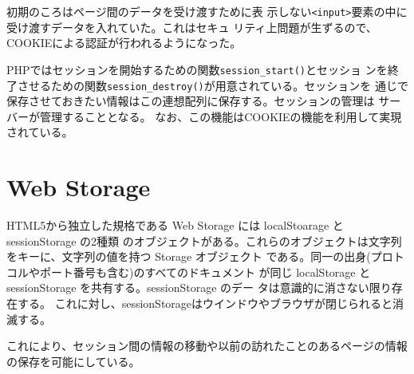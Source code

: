 初期のころはページ間のデータを受け渡すために表
示しない\texttt{<input>}要素の中に受け渡すデータを入れていた。これはセキュ
リティ上問題が生ずるので、COOKIEによる認証が行われるようになった。

PHPではセッションを開始するための関数\texttt{session\_start()}とセッショ
ンを終了させるための関数\texttt{session\_destroy()}が用意されている。セッションを
通じで保存させておきたい情報はこの連想配列に保存する。セッションの管理は
サーバーが管理することとなる。
なお、この機能はCOOKIEの機能を利用して実現されている。
\section{Web Storage}
HTML5から独立した規格である Web Storage には localStoarage と sessionStorage の2種類
のオブジェクトがある。これらのオブジェクトは文字列をキーに、文字列の値を持つ Storage オブジェクト
である。同一の出身(プロトコルやポート番号も含む)のすべてのドキュメント
が同じ localStorage と sessionStorage を共有する。sessionStorage のデー
タは意識的に消さない限り存在する。
%
これに対し、sessionStorageはウインドウやブラウザが閉じられると消滅する。

これにより、セッション間の情報の移動や以前の訪れたことのあるページの情報
の保存を可能にしている。

